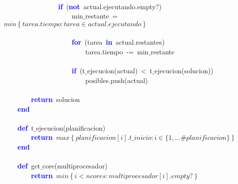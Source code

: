 \mbox{} \\
\mbox{}\ \ \ \ \ \ \ \ \ \ \ \ \ \ \ \ \textbf{\textcolor{Blue}{if}}\ \textcolor{BrickRed}{(}\textbf{\textcolor{Blue}{not}}\ actual\textcolor{BrickRed}{.}ejecutando\textcolor{BrickRed}{.}empty?\textcolor{BrickRed}{)} \\
\mbox{}\ \ \ \ \ \ \ \ \ \ \ \ \ \ \ \ \ \ \ \ min$\_$restante\ \textcolor{BrickRed}{=}\ $min\left\{tarea.tiempo: tarea \in actual.ejecutando\right\}$ \\
\mbox{} \\
\mbox{}\ \ \ \ \ \ \ \ \ \ \ \ \ \ \ \ \ \ \ \ \textbf{\textcolor{Blue}{for}}\ \textcolor{BrickRed}{(}tarea\ \textbf{\textcolor{Blue}{in}}\ actual\textcolor{BrickRed}{.}restantes\textcolor{BrickRed}{)} \\
\mbox{}\ \ \ \ \ \ \ \ \ \ \ \ \ \ \ \ \ \ \ \ \ \ \ \ tarea\textcolor{BrickRed}{.}tiempo\ \textcolor{BrickRed}{-=}\ min$\_$restante \\
\mbox{} \\
\mbox{}\ \ \ \ \ \ \ \ \ \ \ \ \ \ \ \ \ \ \ \ \textbf{\textcolor{Blue}{if}}\ \textcolor{BrickRed}{(}t$\_$ejecucion\textcolor{BrickRed}{(}actual\textcolor{BrickRed}{)}\ \textcolor{BrickRed}{\textless{}}\ t$\_$ejecucion\textcolor{BrickRed}{(}solucion\textcolor{BrickRed}{)}\textcolor{BrickRed}{)} \\
\mbox{}\ \ \ \ \ \ \ \ \ \ \ \ \ \ \ \ \ \ \ \ \ \ \ \ 
posibles\textcolor{BrickRed}{.}push\textcolor{BrickRed}{(}actual\textcolor{BrickRed}{)} \\
\mbox{} \\
\mbox{}\ \ \ \ \ \ \ \ \textbf{\textcolor{Blue}{return}}\ solucion \\
\mbox{}\ \ \ \ \textbf{\textcolor{Blue}{end}} \\
\mbox{} \\
\mbox{}\ \ \ \ \textbf{\textcolor{Blue}{def}}\ t$\_$ejecucion\textcolor{BrickRed}{(}planificacion\textcolor{BrickRed}{)} \\
\mbox{}\ \ \ \ \ \ \ \ \textbf{\textcolor{Blue}{return}}\ $max\left\{ planificacion[i].t\_inicio : i \in \{1, \dots \#planificacion \} \right\}$ \\
\mbox{}\ \ \ \ \textbf{\textcolor{Blue}{end}} \\
\mbox{} \\
\mbox{}\ \ \ \ \textbf{\textcolor{Blue}{def}}\ get$\_$core\textcolor{BrickRed}{(}multiprocesador\textcolor{BrickRed}{)} \\
\mbox{}\ \ \ \ \ \ \ \ \textbf{\textcolor{Blue}{return}}\ $min\left\{i < ncores : multiprocesador[i].empty? \right\}$ \\
